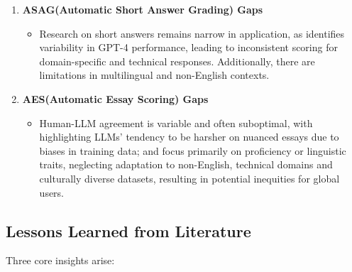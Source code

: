 \begin{enumerate}
    
    \sloppy
    \item \textbf{ASAG(Automatic Short Answer Grading) Gaps} 
        \begin{itemize}
            \item Research on short answers remains narrow in application, as \citet{Schneider2024} identifies variability in GPT-4 performance, leading to inconsistent scoring for domain-specific and technical responses. Additionally, there are limitations in multilingual and non-English contexts.
        \end{itemize}
    
    
    \item \textbf{AES(Automatic Essay Scoring) Gaps}
        \begin{itemize}
            \item Human-LLM agreement is variable and often suboptimal, with \citet{Kundu2024} highlighting LLMs' tendency to be harsher on nuanced essays due to biases in training data; \citet{Mansour2024} and \citet{MizumotoEguchi2023} focus primarily on proficiency or linguistic traits, neglecting adaptation to non-English, technical domains and culturally diverse datasets, resulting in potential inequities for global users.
        \end{itemize}
    
\end{enumerate}

\subsection{Lessons Learned from Literature}

Three core insights arise:

